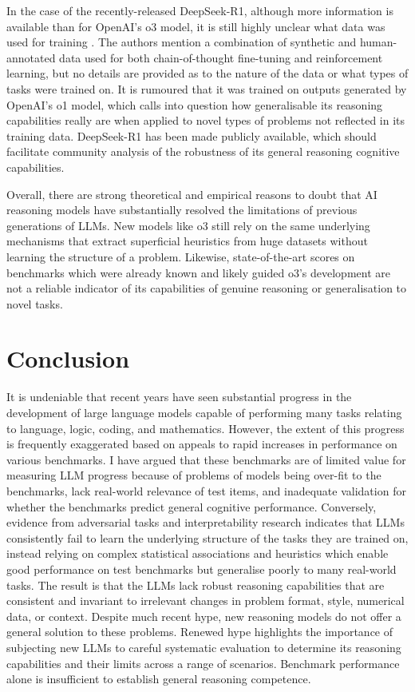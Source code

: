 \documentclass{article}
\begin{document}
In the case of the recently-released DeepSeek-R1, although more information is available than for OpenAI's o3 model, it is still highly unclear what data was used for training \citep{guo2025deepseek}. The authors mention a combination of synthetic and human-annotated data used for both chain-of-thought fine-tuning and reinforcement learning, but no details are provided as to the nature of the data or what types of tasks were trained on. It is rumoured that it was trained on outputs generated by OpenAI's o1 model, which calls into question how generalisable its reasoning capabilities really are when applied to novel types of problems not reflected in its training data. DeepSeek-R1 has been made publicly available, which should facilitate community analysis of the robustness of its general reasoning cognitive capabilities.

Overall, there are strong theoretical and empirical reasons to doubt that AI reasoning models have substantially resolved the limitations of previous generations of LLMs. New models like o3 still rely on the same underlying mechanisms that extract superficial heuristics from huge datasets without learning the structure of a problem. Likewise, state-of-the-art scores on benchmarks which were already known and likely guided o3’s development are not a reliable indicator of its capabilities of genuine reasoning or generalisation to novel tasks. 

\section{Conclusion}

It is undeniable that recent years have seen substantial progress in the development of large language models capable of performing many tasks relating to language, logic, coding, and mathematics. However, the extent of this progress is frequently exaggerated based on appeals to rapid increases in performance on various benchmarks. I have argued that these benchmarks are of limited value for measuring LLM progress because of problems of models being over-fit to the benchmarks, lack real-world relevance of test items, and inadequate validation for whether the benchmarks predict general cognitive performance. Conversely, evidence from adversarial tasks and interpretability research indicates that LLMs consistently fail to learn the underlying structure of the tasks they are trained on, instead relying on complex statistical associations and heuristics which enable good performance on test benchmarks but generalise poorly to many real-world tasks. The result is that the LLMs lack robust reasoning capabilities that are consistent and invariant to irrelevant changes in problem format, style, numerical data, or context. Despite much recent hype, new reasoning models do not offer a general solution to these problems. Renewed hype highlights the importance of subjecting new LLMs to careful systematic evaluation to determine its reasoning capabilities and their limits across a range of scenarios. Benchmark performance alone is insufficient to establish general reasoning competence.


  
\end{document}
